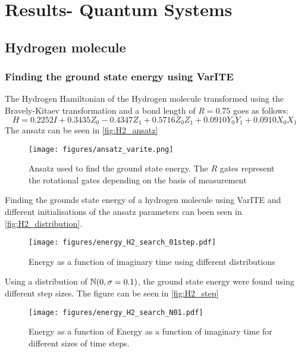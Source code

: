 \documentclass[../main.tex]{subfiles}
\begin{document}
\chapter{Results- Quantum Systems}
\label{sec:sevenfive}


\section{Hydrogen molecule}
\subsection{Finding the ground state energy using VarITE}
The Hydrogen Hamiltonian of the Hydrogen molecule transformed using the Bravely-Kitaev transformation and a bond length of $R=0.75$ \cite{McArdle_2019} goes as follows:
\begin{equation*}
H=0.2252 I+0.3435 Z_{0}-0.4347 Z_{1}+0.5716 Z_{0} Z_{1}+0.0910 Y_{0} Y_{1}+0.0910 X_{0} X_{1}
\end{equation*}
The ansatz can be seen in \autoref{fig:H2_ansatz}
\begin{figure}[h]
    \begin{center}
        \texttt{[image: figures/ansatz\_varite.png]}
        \caption{Ansatz used to find the ground state energy. The $R$ gates represent the rotational gates depending on the basis of measurement}
        \label{fig:H2_ansatz}
    \end{center}
\end{figure}

Finding the  grounds state energy of a hydrogen molecule using VarITE and different initialisations of the ansatz parameters can been seen in \autoref{fig:H2_distribution}.

\begin{figure}
    \begin{center}
        \texttt{[image: figures/energy\_H2\_search\_01step.pdf]}
        \caption{Energy as a function of imaginary time using different distributions}
        \label{fig:H2_distribution}
    \end{center}
\end{figure}

Using a distribution of $\mathbb{N}(0,\sigma=0.1)$, the ground state energy were found using different step sizes. The figure can be seen in \autoref{fig:H2_step}

\begin{figure}
    \begin{center}
        \texttt{[image: figures/energy\_H2\_search\_N01.pdf]}
        \caption{Energy as a function of Energy as a function of imaginary time for different sizes of time steps.}
        \label{fig:H2_step}
    \end{center}
\end{figure}
\end{document}
